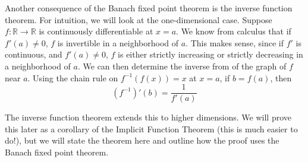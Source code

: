 \documentclass[12pt]{amsart}         %
\theoremstyle{remark}
\newcommand{\R}{\mathbb{R}}
\begin{document}
Another consequence of the Banach fixed point theorem is the inverse function theorem. For intuition, we will look at the one-dimensional case. Suppose $f: \R \rightarrow \R$ is continuously differentiable at $x = a$. We know from calculus that if $f'(a) \neq 0$, $f$ is invertible in a neighborhood of $a$. This makes sense, since if $f'$ is continuous, and $f'(a) \neq 0$, $f$ is either strictly increasing or strictly decreasing in a neighborhood of $a$. We can then determine the inverse from of the graph of $f$ near $a$. Using the chain rule on $f^{-1}(f(x)) = x$ at $x = a$, if $b = f(a)$, then
\[
(f^{-1})'(b) = \frac{1}{f'(a)}
\]

The inverse function theorem extends this to higher dimensions. We will prove this later as a corollary of the Implicit Function Theorem (this is much easier to do!), but we will state the theorem here and outline how the proof uses the Banach fixed point theorem.
\end{document}
